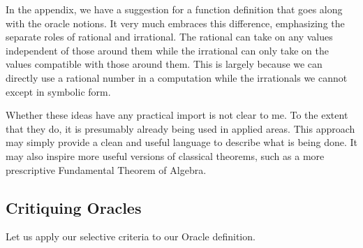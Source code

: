 \documentclass[12pt]{article}
\theoremstyle{remark}
\begin{document}
In the appendix, we have a suggestion for a function definition that goes along with the oracle notions. It very much embraces this difference, emphasizing the separate roles of rational and irrational. The rational can take on any values independent of those around them while the irrational can only take on the values compatible with those around them. This is largely because we can directly use a rational number in a computation while the irrationals we cannot except in symbolic form. 

Whether these ideas have any practical import is not clear to me. To the extent that they do, it is presumably already being used in applied areas. This approach may simply provide a clean and useful language to describe what is being done. It may also inspire more useful versions of classical theorems, such as a more prescriptive Fundamental Theorem of Algebra. 

\subsection{Critiquing Oracles}

Let us apply our selective criteria to our Oracle definition. 
\end{document}
